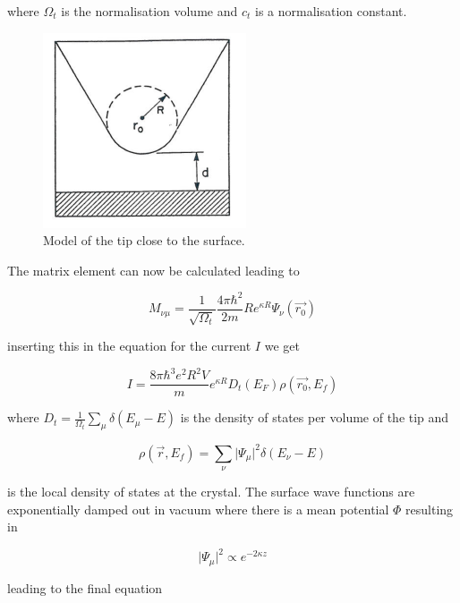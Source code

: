 \noindent where $\Omega_t$ is the normalisation volume and $c_t$ is a normalisation constant.

\begin{figure}[h!]
	\begin{center}
	\includegraphics[scale=4]{figures/10_03.png}
	\caption{Model of the tip close to the surface.}
	\label{fig:stmtip}
	\end{center}
\end{figure}

The matrix element can now be calculated leading to

\begin{equation}
M_{\nu\mu}=\frac{1}{\sqrt{\Omega_t}}\frac{4\pi\hbar^2}{2m}Re^{\kappa R}\Psi_{\nu}(\vec{r_0})
\end{equation}

\noindent inserting this in the equation for the current $I$ we get

\begin{equation}
I=\frac{8\pi\hbar^3e^2R^2V}{m}e^{\kappa R}D_t(E_F)\rho(\vec{r_0},E_f)
\end{equation}

\noindent where $D_t=\frac{1}{\Omega_t}\sum_{\mu}\delta(E_{\mu}-E)$ is the density of states per volume of the tip and

\begin{equation}
\rho(\vec{r},E_f)=\sum_{\nu}\vert\Psi_{\mu} \vert^2\delta(E_{\nu}-E)
\end{equation}

\noindent is the local density of states at the crystal. The surface wave functions are exponentially damped out in vacuum where there is a mean potential $\Phi$ resulting in

\begin{equation}
 \vert\Psi_{\mu}\vert^2\propto e^{-2\kappa z}
\end{equation}

\noindent leading to the final equation

